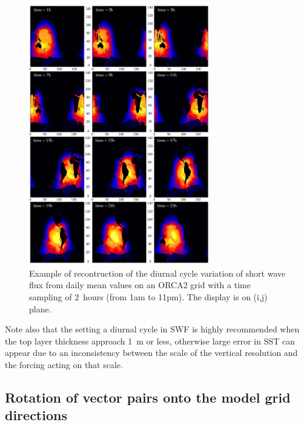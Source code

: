 \begin{figure}[!t]  \begin{center}
\includegraphics[width=0.7\textwidth]{./TexFiles/Figures/Fig_SBC_dcy.pdf}
\caption{ \label{Fig_SBC_dcy}   
Example of recontruction of the diurnal cycle variation of short wave flux  
from daily mean values on an ORCA2 grid with a time sampling of 2~hours (from 1am to 11pm). 
The display is on (i,j) plane. }
\end{center}   \end{figure}

Note also that the setting a diurnal cycle in SWF is highly recommended  when 
the top layer thickness approach 1~m or less, otherwise large error in SST can 
appear due to an inconsistency between the scale of the vertical resolution 
and the forcing acting on that scale.

\subsection{Rotation of vector pairs onto the model grid directions}
\label{SBC_rotation}

